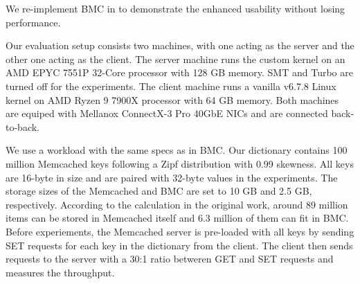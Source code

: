 We re-implement BMC in \projname{} to demonstrate the enhanced usability
    without losing performance.

Our evaluation setup consists two machines, with one
    acting as the server and the other one acting as the client.
The server machine runs the \projname{} custom kernel on an AMD EPYC 7551P
    32-Core processor with 128 GB memory.
SMT and Turbo are turned off for the experiments.
The client machine runs a vanilla v6.7.8 Linux kernel on AMD Ryzen 9 7900X
    processor with 64 GB memory.
Both machines are equiped with Mellanox ConnectX-3 Pro 40GbE NICs and are
    connected back-to-back.


We use a workload with the same specs as in BMC.
Our dictionary contains 100 million Memcached keys following a Zipf
    distribution with 0.99 skewness.
All keys are 16-byte in size and are paired with 32-byte values in the
    experiments.
The storage sizes of the Memcached and BMC are set to 10 GB and 2.5 GB,
    respectively.
According to the calculation in the original work, around 89 million items
    can be stored in Memcached itself and 6.3 million of them can fit in
    BMC.
Before experiements, the Memcached server is pre-loaded with all keys by
    sending SET requests for each key in the dictionary from the client.
The client then sends requests to the server with a 30:1 ratio betweren GET and
    SET requests and measures the throughput.